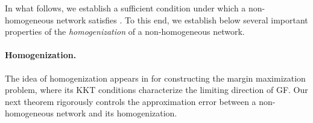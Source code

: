 

In what follows, we establish a sufficient condition under which a non-homogeneous network satisfies .
To this end, we establish below several important properties of the \emph{homogenization} of a non-homogeneous network.


\paragraph{Homogenization.} %
The idea of homogenization appears in  for constructing the margin maximization problem, where its KKT conditions characterize the limiting direction of GF. Our next theorem rigorously controls the approximation error between a non-homogeneous network and its homogenization.

